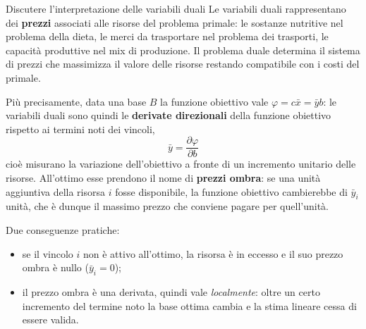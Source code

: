 \documentclass[12pt]{extarticle} %
\begin{document}
\begin{teoriabox}{Discutere l'interpretazione delle variabili duali}
Le variabili duali rappresentano dei \textbf{prezzi} associati alle risorse del problema primale: le sostanze nutritive nel problema della dieta, le merci da trasportare nel problema dei trasporti, le capacità produttive nel mix di produzione. Il problema duale determina il sistema di prezzi che massimizza il valore delle risorse restando compatibile con i costi del primale.

\noindent Più precisamente, data una base $B$ la funzione obiettivo vale $\varphi = c\bar{x} = \bar{y}b$: le variabili duali sono quindi le \textbf{derivate direzionali} della funzione obiettivo rispetto ai termini noti dei vincoli,
\[
\bar{y} = \frac{\partial \varphi}{\partial b}
\]
cioè misurano la variazione dell'obiettivo a fronte di un incremento unitario delle risorse. All'ottimo esse prendono il nome di \textbf{prezzi ombra}: se una unità aggiuntiva della risorsa $i$ fosse disponibile, la funzione obiettivo cambierebbe di $\bar{y}_i$ unità, che è dunque il massimo prezzo che conviene pagare per quell'unità.

\noindent Due conseguenze pratiche:
\begin{itemize}
    \item se il vincolo $i$ non è attivo all'ottimo, la risorsa è in eccesso e il suo prezzo ombra è nullo ($\bar{y}_i = 0$);
    \item il prezzo ombra è una derivata, quindi vale \textit{localmente}: oltre un certo incremento del termine noto la base ottima cambia e la stima lineare cessa di essere valida.
\end{itemize}
\end{teoriabox}
\end{document}

